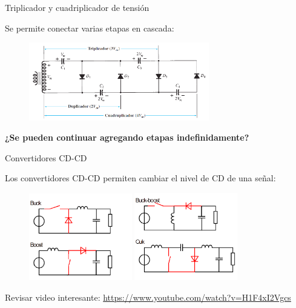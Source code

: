 \documentclass[t,aspectratio=169]{beamer}
\begin{document}
\begin{frame}{Triplicador y cuadriplicador de tensión}

Se permite conectar varias etapas en cascada:

\begin{figure}
    \centering
    \includegraphics[width=0.7\textwidth]{figures/duplicador_multiples_etapas.png}
\end{figure}

\textbf{¿Se pueden continuar agregando etapas indefinidamente?}

\end{frame}


\begin{frame}{Convertidores CD-CD}

Los convertidores CD-CD permiten cambiar el nivel de CD de una señal:

\begin{figure}
    \centering
    \includegraphics[width=0.4\textwidth]{figures/convertidores_cd_cd_1.png}\hspace{1cm}    \includegraphics[width=0.4\textwidth]{figures/convertidores_cd_cd_2.png}
\end{figure}

Revisar video interesante: \url{https://www.youtube.com/watch?v=H1F4xI2Vgcs}

\end{frame}
\end{document}
